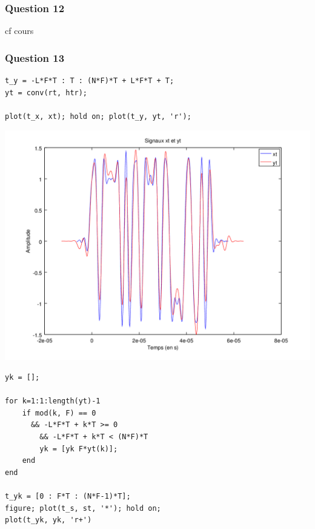\documentclass{acm_proc_article-sp}
\begin{document}
\subsubsection{Question 12}

cf cours

\subsubsection{Question 13}

\begin{center}
\begin{lstlisting}
t_y = -L*F*T : T : (N*F)*T + L*F*T + T;
yt = conv(rt, htr);

plot(t_x, xt); hold on; plot(t_y, yt, 'r');
\end{lstlisting}

\includegraphics[scale=0.45]{yt_13.png}

\begin{lstlisting}
yk = [];

for k=1:1:length(yt)-1
    if mod(k, F) == 0 
      && -L*F*T + k*T >= 0 
        && -L*F*T + k*T < (N*F)*T
        yk = [yk F*yt(k)];
    end
end

t_yk = [0 : F*T : (N*F-1)*T];
figure; plot(t_s, st, '*'); hold on;
plot(t_yk, yk, 'r+')
\end{lstlisting}


\end{center}
\end{document}
